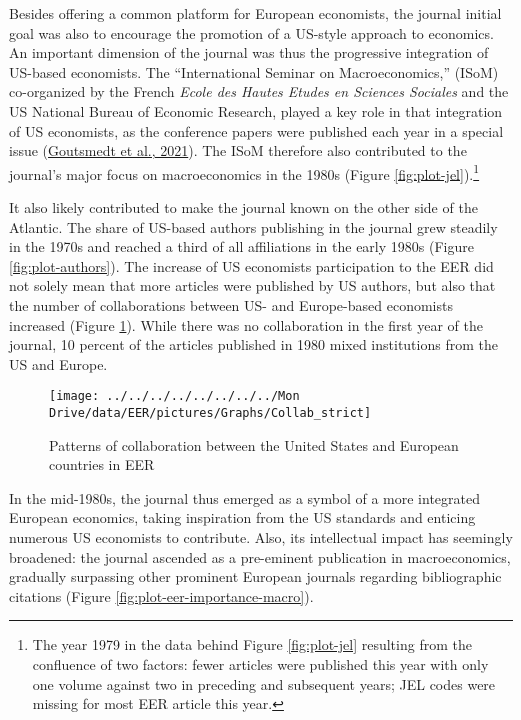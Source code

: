 \documentclass[
]{article}
\begin{document}
Besides offering a common platform for European economists, the journal
initial goal was also to encourage the promotion of a US-style approach
to economics. An important dimension of the journal was thus the
progressive integration of US-based economists. The ``International
Seminar on Macroeconomics,'' (ISoM) co-organized by the French
\emph{Ecole des Hautes Etudes en Sciences Sociales} and the US National
Bureau of Economic Research, played a key role in that integration of US
economists, as the conference papers were published each year in a
special issue (\protect\hyperlink{ref-goutsmedt2021}{Goutsmedt et al.,
2021}). The ISoM therefore also contributed to the journal's major focus
on macroeconomics in the 1980s (Figure \ref{fig:plot-jel}).\footnote{The
  year 1979 in the data behind Figure \ref{fig:plot-jel} resulting from
  the confluence of two factors: fewer articles were published this year
  with only one volume against two in preceding and subsequent years;
  JEL codes were missing for most EER article this year.}

It also likely contributed to make the journal known on the other side
of the Atlantic. The share of US-based authors publishing in the journal
grew steadily in the 1970s and reached a third of all affiliations in
the early 1980s (Figure \ref{fig:plot-authors}). The increase of US
economists participation to the EER did not solely mean that more
articles were published by US authors, but also that the number of
collaborations between US- and Europe-based economists increased (Figure
\ref{fig:plot-collabs}). While there was no collaboration in the first
year of the journal, 10 percent of the articles published in 1980 mixed
institutions from the US and Europe.

\begin{figure}[h]

{\centering \texttt{[image: ../../../../../../../../Mon Drive/data/EER/pictures/Graphs/Collab\_strict]} 

}

\caption{Patterns of collaboration between the United States and European countries in EER}\label{fig:plot-collabs}
\end{figure}

In the mid-1980s, the journal thus emerged as a symbol of a more
integrated European economics, taking inspiration from the US standards
and enticing numerous US economists to contribute. Also, its
intellectual impact has seemingly broadened: the journal ascended as a
pre-eminent publication in macroeconomics, gradually surpassing other
prominent European journals regarding bibliographic citations (Figure
\ref{fig:plot-eer-importance-macro}).
\end{document}
